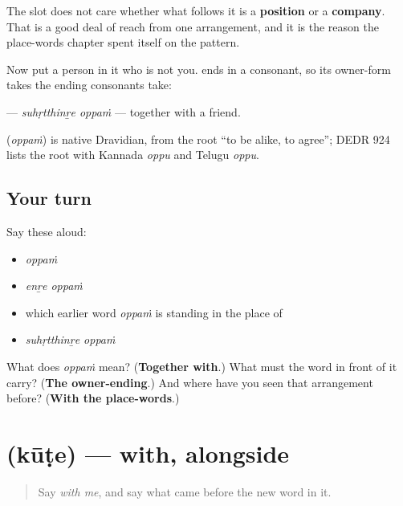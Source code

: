The slot does not care whether what follows it is a \textbf{position} or a \textbf{company}. That is a good deal of reach from one arrangement, and it is the reason the place-words chapter spent itself on the pattern.

Now put a person in it who is not you. \textbf{} ends in a consonant, so its owner-form takes the ending consonants take:

\textbf{ } — \emph{suhṛtthinṟe oppaṁ} — together with a friend.

\begin{cousinweb}
\textbf{} (\emph{oppaṁ}) is native Dravidian, from the root \textquotedblleft{}to be alike, to agree\textquotedblright{}; DEDR 924 lists the root with Kannada \emph{oppu} and Telugu \emph{oppu}.
\end{cousinweb}

\subsection*{Your turn}
Say these aloud:

\begin{itemize}
\raggedright
  \item \emph{oppaṁ}
  \item \emph{enṟe oppaṁ}
  \item which earlier word \emph{oppaṁ} is standing in the place of
  \item \emph{suhṛtthinṟe oppaṁ}
\end{itemize}

\begin{tcolorbox}[breakable,colback=teal!4,colframe=teal!35!black,title={Before you move on}]
What does \emph{oppaṁ} mean? (\textbf{Together with}.) What must the word in front of it carry? (\textbf{The owner-ending}.) And where have you seen that arrangement before? (\textbf{With the place-words}.)
\end{tcolorbox}
\section[\texorpdfstring{\ml{കൂടെ} (kūṭe)}{കൂടെ (kūṭe)}]{ (kūṭe) — with, alongside}

\label{lesson:ML-C86-koode}



\begin{quote}
Say \emph{with me}, and say what came before the new word in it.
\end{quote}

